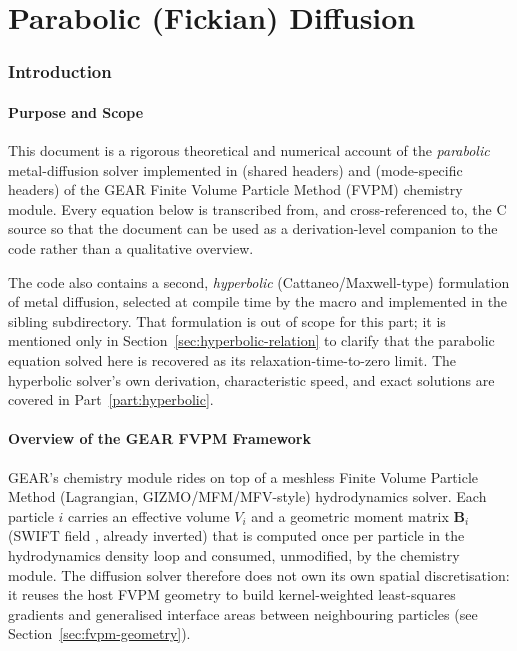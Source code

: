 
\part{Parabolic (Fickian) Diffusion}
\label{part:parabolic}

\section{Introduction}

\subsection{Purpose and Scope}
This document is a rigorous theoretical and numerical account of the
\emph{parabolic} metal-diffusion solver implemented in
 (shared headers) and
 (mode-specific headers)
of the GEAR Finite Volume Particle Method (FVPM) chemistry module. Every
equation below is transcribed from, and cross-referenced to, the C source
so that the document can be used as a derivation-level companion to the
code rather than a qualitative overview.

The code also contains a second, \emph{hyperbolic} (Cattaneo/Maxwell-type)
formulation of metal diffusion, selected at compile time by the macro
 and implemented in the
sibling  subdirectory. That formulation is out of scope
for this part; it is mentioned only in Section~\ref{sec:hyperbolic-relation}
to clarify that the parabolic equation solved here is recovered as its
relaxation-time-to-zero limit. The hyperbolic solver's own derivation,
characteristic speed, and exact solutions are covered in
Part~\ref{part:hyperbolic}.

\subsection{Overview of the GEAR FVPM Framework}
GEAR's chemistry module rides on top of a meshless Finite Volume Particle
Method (Lagrangian, GIZMO/MFM/MFV-style) hydrodynamics solver. Each particle
$i$ carries an effective volume $V_i$ and a geometric moment matrix
$\mathbf{B}_i$ (SWIFT field , already inverted)
that is computed once per particle in the hydrodynamics density loop and
consumed, unmodified, by the chemistry module. The diffusion solver
therefore does not own its own spatial discretisation: it reuses the
host FVPM geometry to build kernel-weighted least-squares gradients and
generalised interface areas between neighbouring particles (see
Section~\ref{sec:fvpm-geometry}).

